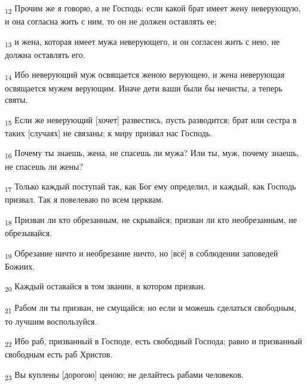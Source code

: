 \begin{tcolorbox}
\textsubscript{12} Прочим же я говорю, а не Господь: если какой брат имеет жену неверующую, и она согласна жить с ним, то он не должен оставлять ее;
\end{tcolorbox}
\begin{tcolorbox}
\textsubscript{13} и жена, которая имеет мужа неверующего, и он согласен жить с нею, не должна оставлять его.
\end{tcolorbox}
\begin{tcolorbox}
\textsubscript{14} Ибо неверующий муж освящается женою верующею, и жена неверующая освящается мужем верующим. Иначе дети ваши были бы нечисты, а теперь святы.
\end{tcolorbox}
\begin{tcolorbox}
\textsubscript{15} Если же неверующий [хочет] развестись, пусть разводится; брат или сестра в таких [случаях] не связаны; к миру призвал нас Господь.
\end{tcolorbox}
\begin{tcolorbox}
\textsubscript{16} Почему ты знаешь, жена, не спасешь ли мужа? Или ты, муж, почему знаешь, не спасешь ли жены?
\end{tcolorbox}
\begin{tcolorbox}
\textsubscript{17} Только каждый поступай так, как Бог ему определил, и каждый, как Господь призвал. Так я повелеваю по всем церквам.
\end{tcolorbox}
\begin{tcolorbox}
\textsubscript{18} Призван ли кто обрезанным, не скрывайся; призван ли кто необрезанным, не обрезывайся.
\end{tcolorbox}
\begin{tcolorbox}
\textsubscript{19} Обрезание ничто и необрезание ничто, но [всё] в соблюдении заповедей Божиих.
\end{tcolorbox}
\begin{tcolorbox}
\textsubscript{20} Каждый оставайся в том звании, в котором призван.
\end{tcolorbox}
\begin{tcolorbox}
\textsubscript{21} Рабом ли ты призван, не смущайся; но если и можешь сделаться свободным, то лучшим воспользуйся.
\end{tcolorbox}
\begin{tcolorbox}
\textsubscript{22} Ибо раб, призванный в Господе, есть свободный Господа; равно и призванный свободным есть раб Христов.
\end{tcolorbox}
\begin{tcolorbox}
\textsubscript{23} Вы куплены [дорогою] ценою; не делайтесь рабами человеков.
\end{tcolorbox}
